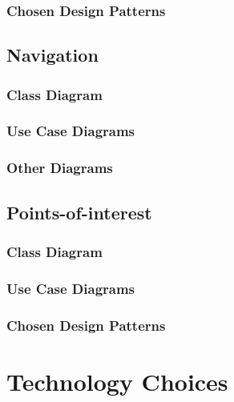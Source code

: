 \documentclass{article}
\begin{document}
        \subsubsection{Chosen Design Patterns}
        \newpage
    \subsection{Navigation}
        \subsubsection{Class Diagram}
        \subsubsection{Use Case Diagrams}
        \subsubsection{Other Diagrams}
        \newpage
    \subsection{Points-of-interest}
        \subsubsection{Class Diagram}
        \subsubsection{Use Case Diagrams}
        \subsubsection{Chosen Design Patterns}
\newpage
\section{Technology Choices}

\end{document}
